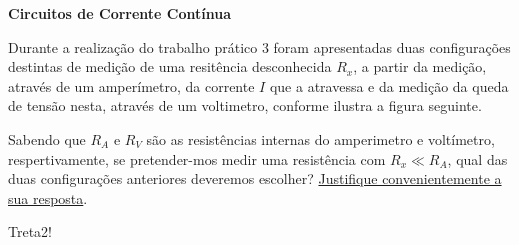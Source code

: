 \question[25]

\textbf{Circuitos de Corrente Cont\'{i}nua}

Durante a realiza\c{c}\~{a}o do trabalho pr\'{a}tico 3 foram apresentadas duas configura\c{c}\~{o}es destintas de medi\c{c}\~{a}o de uma resit\^{e}ncia desconhecida $R_x$, a partir da medi\c{c}\~{a}o, atrav\'{e}s de um amper\'{i}metro, da corrente $I$ que a atravessa e da medi\c{c}\~{a}o da queda de tens\~{a}o nesta, atrav\'{e}s de um voltimetro, conforme ilustra a figura seguinte.


Sabendo que $R_A$ e $R_V$ s\~{a}o as resist\^{e}ncias internas do amperimetro e volt\'{i}metro, respertivamente, se pretender-mos medir uma resist\^{e}ncia com $R_x \ll R_A$, qual das duas configura\c{c}\~{o}es anteriores deveremos escolher? \underline{Justifique convenientemente a sua resposta}.

\begin{solution}
Treta2!
\end{solution}
